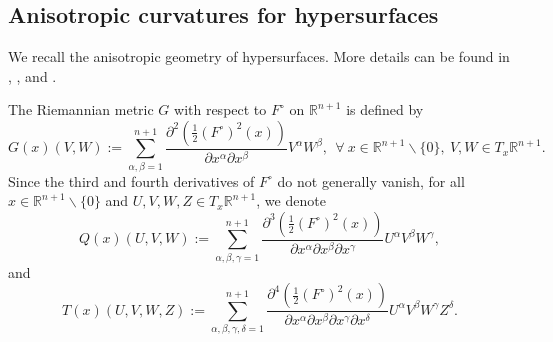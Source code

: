 \documentclass[11pt,reqno]{amsart}
\theoremstyle{definition}
\theoremstyle{remark}
\numberwithin{equation}{section}
\begin{document}
	
	
	\subsection{Anisotropic curvatures for hypersurfaces}
	We recall the anisotropic geometry of hypersurfaces. More details can be found in \cite{Andrews01}, \cite{Xia12}, and \cite{Xia17}.
	
	The Riemannian metric $G$ with respect to $F^{\circ}$ on $\mathbb{R}^{n+1}$ is defined by
	\begin{equation*}
		G(x)(V,W):=\sum\limits_{\alpha,\beta=1}^{n+1} \dfrac{\partial^2 \left( \frac{1}{2}\left(F^{\circ}\right)^2(x) \right)}{\partial x^{\alpha}\partial x^{\beta}} V^{\alpha}W^{\beta},\ \ \forall\ x\in\mathbb{R}^{n+1}\backslash\{0\},\ V,W\in T_{x}\mathbb{R}^{n+1}.
	\end{equation*}
	Since the third and fourth derivatives of $F^{\circ}$ do not generally vanish, for all $x\in\mathbb{R}^{n+1}\backslash\{0\}$ and $U,V,W,Z\in T_{x}\mathbb{R}^{n+1}$, we denote
	\begin{equation*}
		Q(x)(U,V,W):= \sum\limits_{\alpha,\beta,\gamma=1}^{n+1} \dfrac{\partial^3 \left( \frac{1}{2}\left(F^{\circ}\right)^2(x) \right)}{\partial x^{\alpha}\partial x^{\beta} \partial x^{\gamma}} U^{\alpha}V^{\beta}W^{\gamma},
	\end{equation*}
	and
	\begin{equation*}
		T(x)(U,V,W,Z) := \sum\limits_{\alpha,\beta,\gamma,\delta=1}^{n+1}\dfrac{\partial^4\left( \frac{1}{2}\left( F^{\circ} \right)^2(x) \right)}{\partial x^{\alpha}\partial x^{\beta}\partial x^{\gamma}\partial x^{\delta}}U^{\alpha}V^{\beta}W^{\gamma}Z^{\delta}.
	\end{equation*}
	
\end{document}
